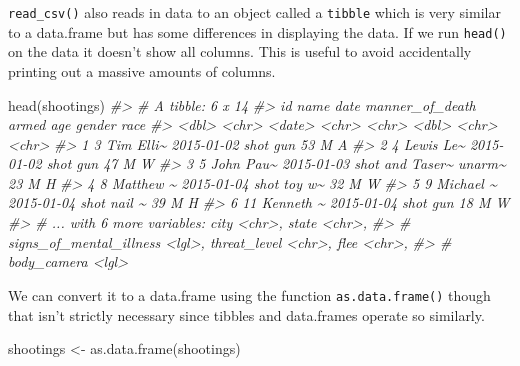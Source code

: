\documentclass[
]{krantz}
\makeatletter
\newenvironment{Shaded}{\begin{snugshade}}{\end{snugshade}}
\newcommand{\CommentTok}[1]{\textcolor[rgb]{0.37,0.37,0.37}{\textit{#1}}}
\newcommand{\FunctionTok}[1]{\textcolor[rgb]{0,0,0}{#1}}
\newcommand{\NormalTok}[1]{#1}
\newcommand{\OtherTok}[1]{\textcolor[rgb]{0.37,0.37,0.37}{#1}}
\newenvironment{kframe}{%
\medskip{}
\setlength{\fboxsep}{.8em}
 \def\at@end@of@kframe{}%
 \ifinner\ifhmode%
  \def\at@end@of@kframe{\end{minipage}}%
  \begin{minipage}{\columnwidth}%
 \fi\fi%
 \def\FrameCommand##1{\hskip\@totalleftmargin \hskip-\fboxsep
 \colorbox{shadecolor}{##1}\hskip-\fboxsep
     \hskip-\linewidth \hskip-\@totalleftmargin \hskip\columnwidth}%
 \MakeFramed {\advance\hsize-\width
   \@totalleftmargin\z@ \linewidth\hsize
   \@setminipage}}%
 {\par\unskip\endMakeFramed%
 \at@end@of@kframe}
\renewenvironment{Shaded}{\begin{kframe}}{\end{kframe}}
\makeatother
\begin{document}
\texttt{read\_csv()} also reads in data to an object called a \texttt{tibble} which is very similar to a data.frame but has some differences in displaying the data. If we run \texttt{head()} on the data it doesn't show all columns. This is useful to avoid accidentally printing out a massive amounts of columns.

\begin{Shaded}
\begin{Highlighting}[]
\FunctionTok{head}\NormalTok{(shootings)}
\CommentTok{\#\textgreater{} \# A tibble: 6 x 14}
\CommentTok{\#\textgreater{}      id name      date       manner\_of\_death armed    age gender race }
\CommentTok{\#\textgreater{}   \textless{}dbl\textgreater{} \textless{}chr\textgreater{}     \textless{}date\textgreater{}     \textless{}chr\textgreater{}           \textless{}chr\textgreater{}  \textless{}dbl\textgreater{} \textless{}chr\textgreater{}  \textless{}chr\textgreater{}}
\CommentTok{\#\textgreater{} 1     3 Tim Elli\textasciitilde{} 2015{-}01{-}02 shot            gun       53 M      A    }
\CommentTok{\#\textgreater{} 2     4 Lewis Le\textasciitilde{} 2015{-}01{-}02 shot            gun       47 M      W    }
\CommentTok{\#\textgreater{} 3     5 John Pau\textasciitilde{} 2015{-}01{-}03 shot and Taser\textasciitilde{} unarm\textasciitilde{}    23 M      H    }
\CommentTok{\#\textgreater{} 4     8 Matthew \textasciitilde{} 2015{-}01{-}04 shot            toy w\textasciitilde{}    32 M      W    }
\CommentTok{\#\textgreater{} 5     9 Michael \textasciitilde{} 2015{-}01{-}04 shot            nail \textasciitilde{}    39 M      H    }
\CommentTok{\#\textgreater{} 6    11 Kenneth \textasciitilde{} 2015{-}01{-}04 shot            gun       18 M      W    }
\CommentTok{\#\textgreater{} \# ... with 6 more variables: city \textless{}chr\textgreater{}, state \textless{}chr\textgreater{},}
\CommentTok{\#\textgreater{} \#   signs\_of\_mental\_illness \textless{}lgl\textgreater{}, threat\_level \textless{}chr\textgreater{}, flee \textless{}chr\textgreater{},}
\CommentTok{\#\textgreater{} \#   body\_camera \textless{}lgl\textgreater{}}
\end{Highlighting}
\end{Shaded}

We can convert it to a data.frame using the function \texttt{as.data.frame()} though that isn't strictly necessary since tibbles and data.frames operate so similarly.

\begin{Shaded}
\begin{Highlighting}[]
\NormalTok{shootings }\OtherTok{\textless{}{-}} \FunctionTok{as.data.frame}\NormalTok{(shootings)}
\end{Highlighting}
\end{Shaded}
\end{document}
